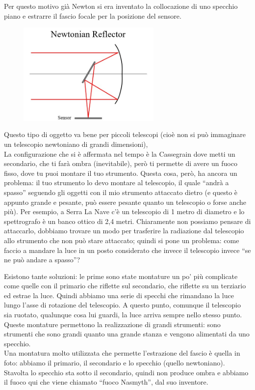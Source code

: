 \documentclass[a4paper,11pt]{article}
\begin{document}
Per questo motivo già Newton si era inventato la collocazione di uno specchio piano e estrarre il fascio focale per la posizione del sensore.

\begin{figure}[h!!]
        \centering
        \includegraphics[width=7cm]{13.jpg}
        \label{}
    \end{figure}

Questo tipo di oggetto va bene per piccoli telescopi (cioè non si può immaginare un telescopio newtoniano di grandi dimensioni), \\
La configurazione che si è affermata nel tempo è la Cassegrain dove metti un secondario, che ti farà ombra (inevitabile), però ti permette di avere un fuoco fisso, dove tu puoi montare il tuo strumento. Questa cosa, però, ha ancora un problema: il tuo strumento lo devo montare al telescopio, il quale “andrà a spasso” seguendo gli oggetti con il mio strumento attaccato dietro (e questo è appunto grande e pesante, può essere pesante quanto un telescopio o forse anche più). Per esempio, a Serra La Nave c’è un telescopio di 1 metro di diametro e lo spettrografo è un banco ottico di 2,4 metri. Chiaramente non possiamo pensare di attaccarlo, dobbiamo trovare un modo per trasferire la radiazione dal telescopio allo strumento che non può stare attaccato; quindi si pone un problema: come faccio a mandare la luce in un posto considerato che invece il telescopio invece “se ne può andare a spasso”?

Esistono tante soluzioni: le prime sono state montature un po’ più complicate come quelle con il primario che riflette sul secondario, che riflette su un terziario ed estrae la luce. Quindi abbiamo una serie di specchi che rimandano la luce lungo l’asse di rotazione del telescopio. A questo punto, comunque il telescopio sia ruotato, qualunque cosa lui guardi, la luce arriva sempre nello stesso punto.\\ 
Queste montature permettono la realizzazione di grandi strumenti: sono strumenti che sono grandi quanto una grande stanza e vengono alimentati da uno specchio.\\
Una montatura molto utilizzata che permette l’estrazione del fascio è quella in foto: abbiamo il primario, il secondario e lo specchio (quello newtoniano). Stavolta lo specchio sta sotto il secondario, quindi non produce ombra e abbiamo il fuoco qui che viene chiamato “fuoco Nasmyth”, dal suo inventore.
\end{document}
